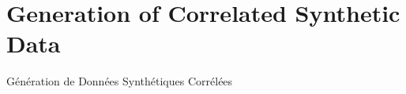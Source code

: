 %
%
%









\newpage



\section{Generation of Correlated Synthetic Data}{Génération de Données Synthétiques Corrélées}

\label{app:sec:syntheticdata}






